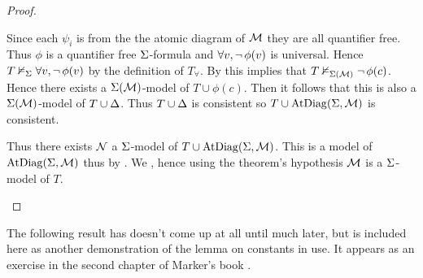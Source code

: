 \begin{proof}
\begin{backward}
        Since each $\psi_i$ is from the the atomic diagram of $\mathcal{M}$ 
        they are all quantifier free.
        Thus $\phi$ is a quantifier free $\Sigma$-formula and 
        $\forall v,  \neg\, \phi(v)$ is universal.
        Hence $T \nvDash_{\Sigma} \forall v, \neg\, \phi(v)$ 
        by the definition of $T_\forall$.
        By 
        this implies that $T \nvDash_{\Sigma(\mathcal{M})} \neg\, \phi(c)$.
        Hence there exists a $\Sigma(\mathcal{M})$-model of $T \cup \phi(c)$.
        Then it follows that this is also a $\Sigma(\mathcal{M})$-model of $T \cup \Delta$.
        Thus $T \cup \Delta$ is consistent so
        $T \cup \mathrm{AtDiag}(\Sigma,\mathcal{M})$ is consistent.

        Thus there exists $\mathcal{N}$ a $\Sigma$-model of 
        $T \cup \mathrm{AtDiag}(\Sigma,\mathcal{M})$.
        This is a model of $\mathrm{AtDiag}(\Sigma,\mathcal{M})$ thus by 
        .
        We , 
        hence using the theorem's hypothesis $\mathcal{M}$ is a $\Sigma$-model of $T$.
    \end{backward}
\end{proof}

The following result has doesn't come up at all until much later,
but is included here as another demonstration of the lemma on constants in use.
It appears as an exercise in the second chapter of Marker's book \cite{marker}.

